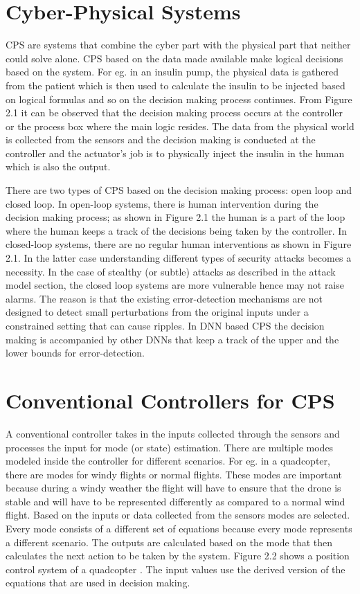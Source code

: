 \section{Cyber-Physical Systems}
\ac{CPS} are systems that combine the cyber part with the physical part that neither could solve alone. CPS based on the data made available make  logical decisions based on the system. For eg. in an insulin pump, the physical data is gathered from the patient which is then used to calculate the  insulin to be injected based on logical formulas and so on the decision making process continues. From Figure 2.1 it can be observed that the decision making process occurs at the controller or the process box where the main logic resides. The data from the physical world is collected from the sensors and the decision making is conducted at the controller and the actuator's job is to physically inject the insulin in the  human which is also the output. 


There are two types of CPS based on the decision making process: open loop and closed loop. In open-loop systems, there is human intervention during the decision making process; as shown in Figure 2.1 the human is a part of the loop where the human keeps a track of the decisions being taken by the controller. 	In closed-loop systems, there are no regular human interventions as shown in Figure 2.1. In the latter case understanding different types of security attacks becomes a necessity. In the case of stealthy (or subtle) attacks as described in the attack model section, the closed loop systems are more vulnerable hence may not raise alarms. The reason is that the existing error-detection mechanisms are not designed to detect small perturbations from the original inputs under a constrained setting that can cause ripples. In DNN based CPS the decision making is accompanied by other DNNs that keep a track of the upper and the lower bounds for error-detection. 

\section{Conventional Controllers for CPS}

A conventional controller takes in the inputs collected through the sensors and processes the input for mode (or state) estimation. There are multiple modes  modeled inside the controller for different scenarios. For eg. in a quadcopter, there are modes for windy flights or normal flights. These modes are important because during a windy weather the flight will have to ensure that the drone is stable and will have to be represented differently as compared to a normal wind flight. Based on the inputs or data collected from the sensors modes are selected. Every mode consists of a different set of equations because every mode represents a different scenario. The outputs are calculated based on the mode that then calculates the next action to be taken by the system. Figure 2.2 shows a position control system of a quadcopter \cite{inbook}. The input values use the derived version of the equations that are used in decision making. 

